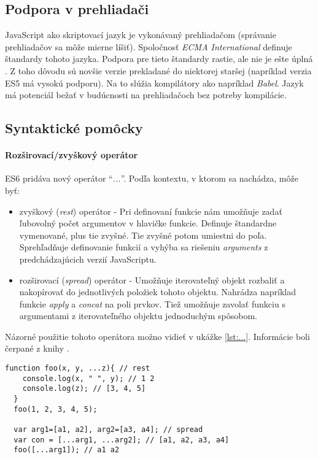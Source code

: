 \subsection{Podpora v prehliadači}
JavaScript ako skriptovací jazyk je vykonávaný prehliadačom (správanie prehliadačov sa môže mierne líšiť). Spoločnosť \emph{ECMA International} definuje štandardy tohoto jazyka. Podpora pre tieto štandardy rastie, ale nie je ešte úplná \cite{podporaES7}. 
Z toho dôvodu sú novšie verzie prekladané do niektorej staršej (napríklad verzia ES5 má vysokú podporu). Na to slúžia kompilátory ako napríklad \emph{Babel}. Jazyk \JS{} má potenciál bežať v budúcnosti na prehliadačoch bez potreby kompilácie.

\subsection{Syntaktické pomôcky}

\paragraph{Rozširovací/zvyškový operátor}
\label{par:spreadOp}
ES6 pridáva nový operátor ``\emph{...}''. Podľa kontextu, v ktorom sa nachádza, môže byť:
\begin{itemize}
  \item zvyškový (\emph{rest}) operátor - Pri definovaní funkcie nám umožňuje zadať ľubovolný počet argumentov v hlavičke funkcie. Definuje štandardne vymenované, plus tie zvyšné. Tie zvyšné potom umiestni do poľa. Sprehľadňuje definovanie funkcií a vyhýba sa riešeniu \emph{arguments} z predchádzajúcich verzií JavaScriptu.
  \item rozširovací (\emph{spread}) operátor - Umožňuje iterovateľný objekt rozbaliť a nakopírovať do jednotlivých položiek tohoto objektu. Nahrádza napríklad funkcie \emph{apply} a \emph{concat} na poli prvkov. Tiež umožňuje zavolať funkciu s argumentami z iterovateľného objektu jednoduchým spôsobom.
\end{itemize}
Názorné použitie tohoto operátora možno vidieť v ukážke \ref{lst:...}.
Informácie boli čerpané z knihy \cite[Exploring ES6]{expES6}.

\begin{lstlisting}[caption=rozširovací/zvyškový operátor, label={lst:...}]
  function foo(x, y, ...z){ // rest
    console.log(x, " ", y); // 1 2
    console.log(z); // [3, 4, 5]
  }
  foo(1, 2, 3, 4, 5);

  var arg1=[a1, a2], arg2=[a3, a4]; // spread
  var con = [...arg1, ...arg2]; // [a1, a2, a3, a4]
  foo([...arg1]); // a1 a2
\end{lstlisting}

